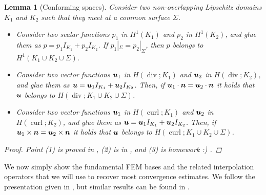 \documentclass{article}
\renewcommand{\vec}{\vectorsym}
\DeclareMathOperator{\dive}{\text{div}}
\DeclareMathOperator{\curl}{\text{curl}}
\newtheorem{lemma}{Lemma}
\begin{document}
\begin{lemma}[Conforming spaces]
    Consider two non-overlapping Lipschitz domains $K_1$ and $K_2$ such that they meet at a common surface $\Sigma$. 
    \begin{itemize}
        \item Consider two scalar functions $p_1$ in $H^1(K_1)$ and $p_2$ in $H^1(K_2)$, and glue them as $p = p_1 I_{K_1} + p_2 I_{K_2}$. If $p_1|_\Sigma = p_2|_\Sigma$, then $p$ belongs to $H^1(K_1\cup K_2\cup \Sigma)$. 
        \item Consider two vector functions $\vec u_1$ in $H(\dive;K_1)$ and $\vec u_2$ in $H(\dive; K_2)$, and glue them as $\vec u = \vec u_1 I_{K_1} + \vec u_2 I_{K_2}$. Then, if $\vec u_1\cdot \vec n= \vec u_2\cdot \vec n$ it holds that $\vec u$ belongs to $H(\dive; K_1\cup K_2 \cup \Sigma)$. 
        \item Consider two vector functions $\vec u_1$ in $H(\curl;K_1)$ and $\vec u_2$ in $H(\curl; K_2)$, and glue them as $\vec u = \vec u_1 I_{K_1} + \vec u_2 I_{K_2}$. Then, if $\vec u_1\times \vec n= \vec u_2\times \vec n$ it holds that $\vec u$ belongs to $H(\curl; K_1\cup K_2 \cup \Sigma)$. 
    \end{itemize}
    \begin{proof}
        Point (1) is proved in \cite{gatica2014simple}, (2) is in \cite{monk2003finite}, and (3) is homework :) . 
    \end{proof}
\end{lemma}

We now simply show the fundamental FEM bases and the related interpolation operators that we will use to recover most convergence estimates. We follow the presentation given in \cite{monk2003finite}, but similar results can be found in \cite{ern2004theory}.
\end{document}

